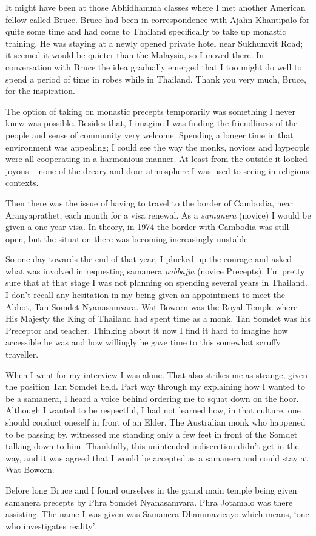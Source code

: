 It might have been at those Abhidhamma classes where I met another
American fellow called Bruce. Bruce had been in correspondence with
Ajahn Khantipalo for quite some time and had come to Thailand
specifically to take up monastic training. He was staying at a newly
opened private hotel near Sukhumvit Road; it seemed it would be quieter
than the Malaysia, so I moved there. In conversation with Bruce the idea
gradually emerged that I too might do well to spend a period of time in
robes while in Thailand. Thank you very much, Bruce, for the
inspiration.

The option of taking on monastic precepts temporarily was something I
never knew was possible. Besides that, I imagine I was finding the
friendliness of the people and sense of community very welcome. Spending
a longer time in that environment was appealing; I could see the way the
monks, novices and laypeople were all cooperating in a harmonious
manner. At least from the outside it looked joyous -- none of the dreary
and dour atmosphere I was used to seeing in religious contexts.

Then there was the issue of having to travel to the border of Cambodia,
near Aranyaprathet, each month for a visa renewal. As a \emph{samanera}
(novice) I would be given a one-year visa. In theory, in 1974 the border
with Cambodia\cite{cambodia} was still open, but the situation there was becoming
increasingly unstable.

So one day towards the end of that year, I plucked up the courage and
asked what was involved in requesting samanera \emph{pabbajja} (novice
Precepts). I'm pretty sure that at that stage I was not planning on
spending several years in Thailand. I don't recall any hesitation in my
being given an appointment to meet the Abbot, Tan Somdet Nyanasamvara.
Wat Boworn was the Royal Temple where His Majesty the King of Thailand
had spent time as a monk. Tan Somdet was his Preceptor and teacher.
Thinking about it now I find it hard to imagine how accessible he was
and how willingly he gave time to this somewhat scruffy traveller.

When I went for my interview I was alone. That also strikes me as
strange, given the position Tan Somdet held. Part way through my
explaining how I wanted to be a samanera, I heard a voice behind
ordering me to squat down on the floor. Although I wanted to be
respectful, I had not learned how, in that culture, one should conduct
oneself in front of an Elder. The Australian monk who happened to be
passing by, witnessed me standing only a few feet in front of the Somdet
talking down to him. Thankfully, this unintended indiscretion didn't get
in the way, and it was agreed that I would be accepted as a samanera and
could stay at Wat Boworn.

Before long Bruce and I found ourselves in the grand main temple being given
samanera precepts by Phra Somdet Nyanasamvara. Phra Jotamalo was there
assisting. The name I was given was Samanera Dhammavicayo which means,
`one who investigates reality'.

